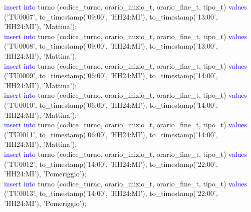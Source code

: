 \documentclass{article}
\begin{document}
\begin{flushleft}
{        \hspace*{0.5em}\textcolor{blue}{insert into} turno (codice\_turno, orario\_inizio\_t, orario\_fine\_t, tipo\_t) \textcolor{blue}{values} \hspace*{0.5em}('TU0007', to\_timestamp('09:00', 'HH24:MI'), to\_timestamp('13:00', 'HH24:MI'), \hspace*{0.5em}'Mattina'); \\
        \hspace*{0.5em}\textcolor{blue}{insert into} turno (codice\_turno, orario\_inizio\_t, orario\_fine\_t, tipo\_t) \textcolor{blue}{values} \hspace*{0.5em}('TU0008', to\_timestamp('09:00', 'HH24:MI'), to\_timestamp('13:00', 'HH24:MI'), \hspace*{0.5em}'Mattina'); \\
        \hspace*{0.5em}\textcolor{blue}{insert into} turno (codice\_turno, orario\_inizio\_t, orario\_fine\_t, tipo\_t) \textcolor{blue}{values} \hspace*{0.5em}('TU0009', to\_timestamp('06:00', 'HH24:MI'), to\_timestamp('14:00', 'HH24:MI'), \hspace*{0.5em}'Mattina'); \\
        \hspace*{0.5em}\textcolor{blue}{insert into} turno (codice\_turno, orario\_inizio\_t, orario\_fine\_t, tipo\_t) \textcolor{blue}{values} \hspace*{0.5em}('TU0010', to\_timestamp('06:00', 'HH24:MI'), to\_timestamp('14:00', 'HH24:MI'), \hspace*{0.5em}'Mattina'); \\
        \hspace*{0.5em}\textcolor{blue}{insert into} turno (codice\_turno, orario\_inizio\_t, orario\_fine\_t, tipo\_t) \textcolor{blue}{values} \hspace*{0.5em}('TU0011', to\_timestamp('06:00', 'HH24:MI'), to\_timestamp('14:00', 'HH24:MI'), \hspace*{0.5em}'Mattina'); \\
        \hspace*{0.5em}\textcolor{blue}{insert into} turno (codice\_turno, orario\_inizio\_t, orario\_fine\_t, tipo\_t) \textcolor{blue}{values} \hspace*{0.5em}('TU0012', to\_timestamp('14:00', 'HH24:MI'), to\_timestamp('22:00', 'HH24:MI'), \hspace*{0.5em}'Pomeriggio'); \\
        \hspace*{0.5em}\textcolor{blue}{insert into} turno (codice\_turno, orario\_inizio\_t, orario\_fine\_t, tipo\_t) \textcolor{blue}{values} \hspace*{0.5em}('TU0013', to\_timestamp('14:00', 'HH24:MI'), to\_timestamp('22:00', 'HH24:MI'), \hspace*{0.5em}'Pomeriggio'); \\
}
\end{flushleft}
\end{document}
